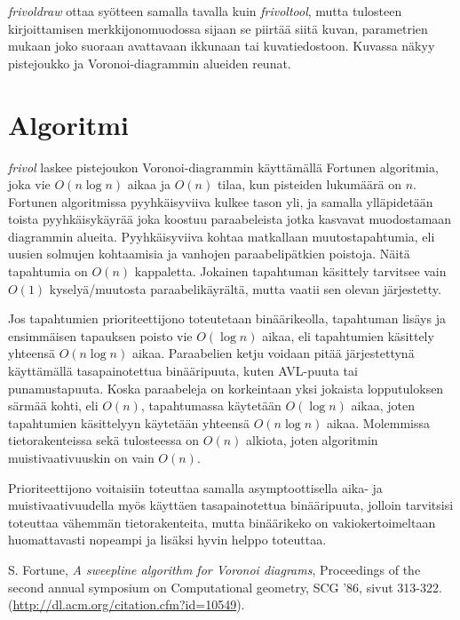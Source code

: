 \documentclass[a4paper, 11pt, finnish]{article}
\begin{document}
\emph{frivoldraw} ottaa syötteen samalla tavalla kuin \emph{frivoltool}, mutta tulosteen kirjoittamisen merkkijonomuodossa sijaan se piirtää siitä kuvan, parametrien mukaan joko suoraan avattavaan ikkunaan tai kuvatiedostoon. Kuvassa näkyy pistejoukko ja Voronoi-diagrammin alueiden reunat.

\section*{Algoritmi}
\emph{frivol} laskee pistejoukon Voronoi-diagrammin käyttämällä Fortunen algoritmia, joka vie $O(n \log n)$ aikaa ja $O(n)$ tilaa, kun pisteiden lukumäärä on $n$. Fortunen algoritmissa pyyhkäisyviiva kulkee tason yli, ja samalla ylläpidetään toista pyyhkäisykäyrää joka koostuu paraabeleista jotka kasvavat muodostamaan diagrammin alueita. Pyyhkäisyviiva kohtaa matkallaan muutostapahtumia, eli uusien solmujen kohtaamisia ja vanhojen paraabelipätkien poistoja. Näitä tapahtumia on $O(n)$ kappaletta. Jokainen tapahtuman käsittely tarvitsee vain $O(1)$ kyselyä/muutosta paraabelikäyrältä, mutta vaatii sen olevan järjestetty.\cite{fortunepaperi}

Jos tapahtumien prioriteettijono toteutetaan binäärikeolla, tapahtuman lisäys ja ensimmäisen tapauksen poisto vie $O(\log n)$ aikaa, eli tapahtumien käsittely yhteensä $O(n \log n)$ aikaa. Paraabelien ketju voidaan pitää järjestettynä käyttämällä tasapainotettua binääripuuta, kuten AVL-puuta tai punamustapuuta. Koska paraabeleja on korkeintaan yksi jokaista lopputuloksen särmää kohti, eli $O(n)$, tapahtumassa käytetään $O(\log n)$ aikaa, joten tapahtumien käsittelyyn käytetään yhteensä $O(n \log n)$ aikaa. Molemmissa tietorakenteissa sekä tulosteessa\cite{fortunepaperi} on $O(n)$ alkiota, joten algoritmin muistivaativuuskin on vain $O(n)$.

Prioriteettijono voitaisiin toteuttaa samalla asymptoottisella aika- ja muistivaativuudella myös käyttäen tasapainotettua binääripuuta, jolloin tarvitsisi toteuttaa vähemmän tietorakenteita, mutta binäärikeko on vakiokertoimeltaan huomattavasti nopeampi ja lisäksi hyvin helppo toteuttaa.

\begin{thebibliography}{9}
 S. Fortune, \emph{A sweepline algorithm for Voronoi diagrams}, Proceedings of the second annual symposium on Computational geometry, SCG '86, sivut 313-322. (\url{http://dl.acm.org/citation.cfm?id=10549}). \\
\end{thebibliography}
\end{document}
